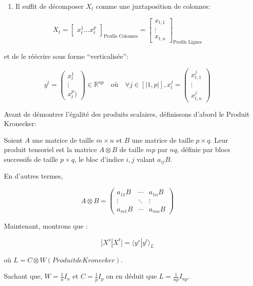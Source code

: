 \documentclass[
]{article}
\providecommand{\tightlist}{%
  \setlength{\itemsep}{0pt}\setlength{\parskip}{0pt}}
\begin{document}
\begin{enumerate}
\def\labelenumi{\alph{enumi})}
\tightlist
\item
  Il suffit de décomposer \(X_t\) comme une juxtaposition de colonnes:
\end{enumerate}

\[ X_t = \begin{bmatrix}
x^{1}_{t}
\ldots 
x^{p}_{t}
\end{bmatrix}_{\text{Profils Colonnes}} = \begin{bmatrix}
x_{t,1} \\
\vdots \\
x_{t,n}
\end{bmatrix}_{\text{Profils Lignes}} 
\]

et de le réécrire sous forme ``verticalisée'':

\[ y^t = \begin{pmatrix} x^{1}_{t} \\ \vdots \\ x^{p}_{t}) \end{pmatrix} \in \mathbb{R}^{np} \quad \text{où} \quad \forall j \in [|1,p|], x^{j}_{t} = \begin{pmatrix}
x^{j}_{t,1} \\
\vdots \\
x^{j}_{t,n}
\end{pmatrix} \]

Avant de démontrer l'égalité des produits scalaires, définissons d'abord
le Produit Kronecker:

Soient \(A\) une matrice de taille \(m \times n\) et \(B\) une matrice
de taille \(p \times q\). Leur produit tensoriel est la matrice
\(A \otimes B\) de taille \(mp\) par \(nq\), définie par blocs
successifs de taille \(p \times q\), le bloc d'indice \(i,j\) valant
\(a_{ij}B\).

En d'autres termes,

\[
A \otimes B = \begin{pmatrix}
a_{11}B & \cdots & a_{1n}B \\
\vdots & \ddots & \vdots \\
a_{m1}B & \cdots & a_{mn}B
\end{pmatrix}
\]

Maintenant, montrons que :

\[ [ X^s  |  X^t ] = \langle y^s | y^t \rangle_L \]

où \(L = C \otimes W (Produit de Kronecker)\).

Sachant que, \(W = \frac{1}{n}I_n\) et \(C = \frac{1}{p}I_p\) on en
déduit que \(L = \frac{1}{np}I_{np}\).
\end{document}
